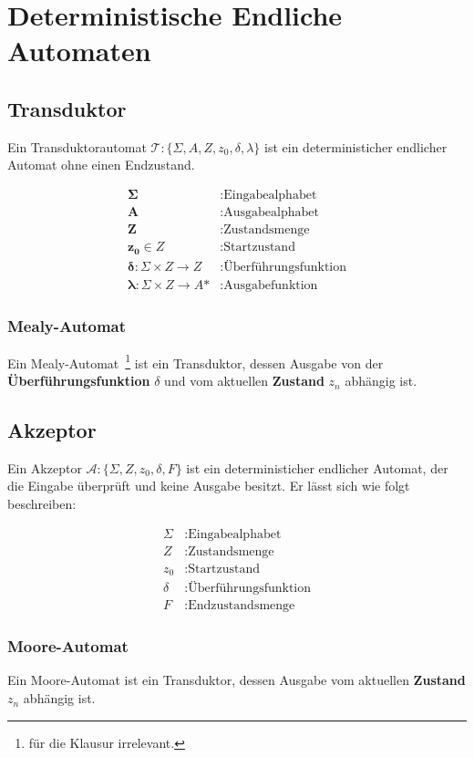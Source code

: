 
\sloppy
\chapter{Deterministische Endliche Automaten}
\fussy
\section{Transduktor}
\begin{definition}
Ein Transduktorautomat $\mathcal{T}: \{\Sigma, A, Z, z_{0}, \delta, \lambda\}$ ist ein deterministicher endlicher Automat ohne einen Endzustand.
\end{definition}
\begin{align*}
    \mathbf{\Sigma} &: \text{Eingabealphabet}\\
    \mathbf{A} &: \text{Ausgabealphabet}\\
    \mathbf{Z} &: \text{Zustandsmenge}\\
    \mathbf{z_{0}} \in Z &: \text{Startzustand}\\
    \mathbf{\delta }: \Sigma \times Z \rightarrow Z &: \text{Überführungsfunktion}\\
    \mathbf{\lambda }: \Sigma \times Z \rightarrow A\text{*} &: \text{Ausgabefunktion}
\end{align*}
\subsection{Mealy-Automat}
\begin{definition}
    Ein Mealy-Automat\ \footnote{für die Klausur irrelevant.} ist ein Transduktor, dessen Ausgabe von der \textbf{Überführungsfunktion} $\delta$ und vom aktuellen \textbf{Zustand} $z_n$ abhängig ist.
\end{definition}
%
\section{Akzeptor}
\begin{definition}
Ein Akzeptor $\mathcal{A}: \{\Sigma, Z, z_{0}, \delta, F\}$ ist ein deterministicher endlicher Automat, der die Eingabe überprüft und keine Ausgabe besitzt. Er lässt sich wie folgt beschreiben:
\end{definition}
    \begin{align*}
    \Sigma &: \text{Eingabealphabet}\\
    Z &: \text{Zustandsmenge}\\
    z_{0} &: \text{Startzustand}\\
    \delta &: \text{Überführungsfunktion}\\
    F &: \text{Endzustandsmenge}
\end{align*}
%
\subsection{Moore-Automat}
\begin{definition}
    Ein Moore-Automat ist ein Transduktor, dessen Ausgabe vom aktuellen \textbf{Zustand} $z_n$ abhängig ist.
\end{definition}